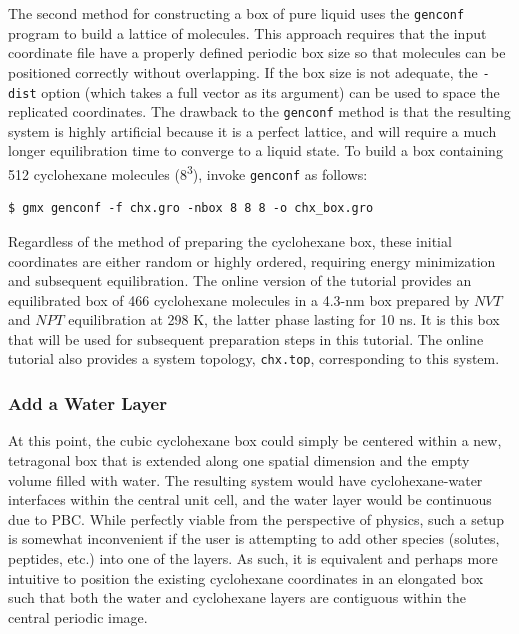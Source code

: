 \documentclass[9pt,tutorial,pubversion]{livecoms}
\begin{document}
The second method for constructing a box of pure liquid uses the \texttt{genconf} program to build a lattice of molecules. This approach requires that the input coordinate file have a properly defined periodic box size so that molecules can be positioned correctly without overlapping. If the box size is not adequate, the \texttt{-dist} option (which takes a full vector as its argument) can be used to space the replicated coordinates. The drawback to the \texttt{genconf} method is that the resulting system is highly artificial because it is a perfect lattice, and will require a much longer equilibration time to converge to a liquid state. To build a box containing 512 cyclohexane molecules (8\textsuperscript{3}), invoke \texttt{genconf} as follows:

\begin{lstlisting}
$ gmx genconf -f chx.gro -nbox 8 8 8 -o chx_box.gro
\end{lstlisting}
%
Regardless of the method of preparing the cyclohexane box, these initial coordinates are either random or highly ordered, requiring energy minimization and subsequent equilibration. The online version of the tutorial provides an equilibrated box of 466 cyclohexane molecules in a 4.3-nm box prepared by $NVT$ and $NPT$ equilibration at 298 K, the latter phase lasting for 10 ns. It is this box that will be used for subsequent preparation steps in this tutorial. The online tutorial also provides a system topology, \texttt{chx.top}, corresponding to this system.

\subsubsection{Add a Water Layer} \label{biphasic_water}

At this point, the cubic cyclohexane box could simply be centered within a new, tetragonal box that is extended along one spatial dimension and the empty volume filled with water. The resulting system would have cyclohexane-water interfaces within the central unit cell, and the water layer would be continuous due to PBC. While perfectly viable from the perspective of physics, such a setup is somewhat inconvenient if the user is attempting to add other species (solutes, peptides, etc.) into one of the layers. As such, it is equivalent and perhaps more intuitive to position the existing cyclohexane coordinates in an elongated box such that both the water and cyclohexane layers are contiguous within the central periodic image.
\end{document}

